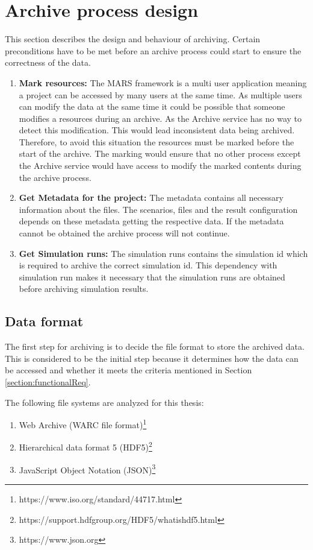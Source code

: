 \section{Archive process design}
This section describes the design and behaviour of archiving. Certain preconditions have to be met before an archive process could start 
to ensure the correctness of the data.

\begin{enumerate}
    \item \textbf{Mark resources:} The MARS framework is a multi user application meaning a project can be accessed by many users at the same time. 
    As multiple users can modify the data at the same time it could be possible that someone modifies a resources during an archive. As the 
    Archive service has no way to detect this modification. This would lead inconsistent data being archived.
    Therefore, to avoid this situation the resources must be marked before the start of the archive. The marking would ensure that no other process except the Archive
    service would have access to modify the marked contents during the archive process. 
    \item \textbf{Get Metadata for the project:} The metadata contains all necessary information about the files. The scenarios, files and the result 
    configuration depends on these metadata getting 
    the respective data. If the metadata cannot be obtained the archive process will not continue.
    \item \textbf{Get Simulation runs:} The simulation runs contains the simulation id which is required to archive the correct simulation id. This dependency
    with simulation run makes it necessary that the simulation runs are obtained before archiving simulation results.
\end{enumerate}


\subsection{Data format}
The first step for archiving is to decide the file format to store the archived data. This is
considered to be the initial step because it determines how the data can be accessed and whether it meets
the criteria mentioned in Section \ref{section:functionalReq}.

\par
The following file systems are analyzed for this thesis:
\begin{enumerate}
    \item Web Archive (WARC file format)\footnote{https://www.iso.org/standard/44717.html}
    \item Hierarchical data format 5 (HDF5)\footnote{https://support.hdfgroup.org/HDF5/whatishdf5.html}
    \item JavaScript Object Notation (JSON)\footnote{https://www.json.org}
\end{enumerate}

